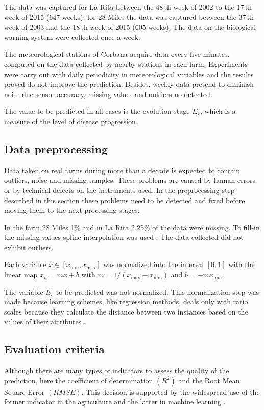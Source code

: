 The data was captured for La Rita between the 48\,th week of
2002 to the 17\,th week of 2015 (647 weeks); for 28 Miles the
data was captured between the 37\,th week of 2003 and the
18\,th week of 2015 (605 weeks).
%
The data on the biological warning system were collected once a
week.

The meteorological stations of Corbana acquire data every five
minutes.
%
computed on the data collected by nearby stations in each farm. Experiments were carry out with daily periodicity in meteorological variables and the results proved do not improve the prediction. Besides, weekly data pretend to diminish noise due sensor accuracy, missing values and outliers no detected.

The value to be predicted in all cases is the evolution stage $E_s$,
which is a measure of the level of disease progression.

\subsection{Data preprocessing}

Data taken on real farms during more than a decade is expected to
contain outliers, noise and missing samples.  These problems are
caused by human errors or by technical defects on the instruments
used.  
%
In the preprocessing step described in this section these problems
need to be detected and fixed before moving them to the next
processing stages.

In the farm 28 Miles 1\% and in La Rita 2.25\% of the data were missing.
%
To fill-in the missing values spline interpolation was used \citet{Alglib2017}.
%
The data collected did not exhibit outliers.

Each variable $x\in[x_{\min},x_{\max}]$ was normalized into the
interval $[0,1]$ with the linear map $x_n = mx+b$ with
$m=1/(x_{\max}-x_{\min})$ and $b=-mx_{\min}$.

The variable $E_s$ to be predicted was not normalized.
This normalization step was made because learning schemes, like regression methods, 
deals only with ratio scales because they calculate the distance between two instances based on the 
values of their attributes \citet{Witten2011}.

\subsection{Evaluation criteria}

Although there are many types of indicators to assess the quality of
the prediction, here the coefficient of determination $(R^2)$ and the
Root Mean Square Error $(RMSE)$.
%
This decision is supported by the widespread use of the former
indicator in the agriculture and the latter in machine learning
\citep{Soares2013,Soares2014,Ibrahim2014,Demir2014}.

